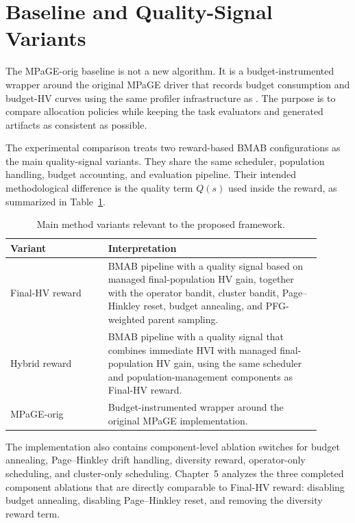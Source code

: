 \documentclass[../main.tex]{subfiles}
\begin{document}
\section{Baseline and Quality-Signal Variants}

The MPaGE-orig baseline is not a new algorithm. It is a budget-instrumented wrapper around the original MPaGE driver that records budget consumption and budget-HV curves using the same profiler infrastructure as \bmab{}. The purpose is to compare allocation policies while keeping the task evaluators and generated artifacts as consistent as possible.

The experimental comparison treats two reward-based BMAB configurations as the main quality-signal variants. They share the same scheduler, population handling, budget accounting, and evaluation pipeline. Their intended methodological difference is the quality term $Q(s)$ used inside the reward, as summarized in Table~\ref{tab:method-ablation}.

\begin{table}[H]
  \centering
  \caption{Main method variants relevant to the proposed framework.}
  \label{tab:method-ablation}
  \small
  \begin{tabular}{>{\raggedright\arraybackslash}p{0.29\linewidth}>{\raggedright\arraybackslash}p{0.61\linewidth}}
    \toprule
    Variant & Interpretation \\
    \midrule
    Final-HV reward & BMAB pipeline with a quality signal based on managed final-population HV gain, together with the operator bandit, cluster bandit, Page--Hinkley reset, budget annealing, and PFG-weighted parent sampling. \\
    Hybrid reward & BMAB pipeline with a quality signal that combines immediate HVI with managed final-population HV gain, using the same scheduler and population-management components as Final-HV reward. \\
    MPaGE-orig & Budget-instrumented wrapper around the original MPaGE implementation. \\
    \bottomrule
  \end{tabular}
\end{table}

The implementation also contains component-level ablation switches for budget annealing, Page--Hinkley drift handling, diversity reward, operator-only scheduling, and cluster-only scheduling. Chapter~5 analyzes the three completed component ablations that are directly comparable to Final-HV reward: disabling budget annealing, disabling Page--Hinkley reset, and removing the diversity reward term.
\end{document}
